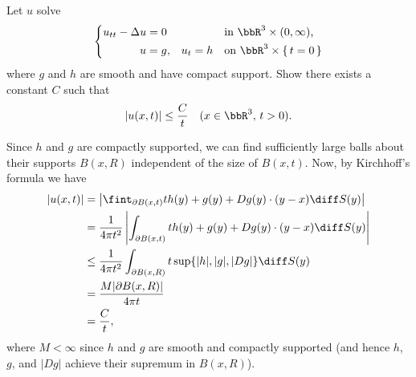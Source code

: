 \begin{problem}
  Let \(u\) solve
  \[
    \left\{
      \begin{aligned}
        u_{tt}-\Delta u=0\phantom{,}&&&&&\text{in \(\bbR^3\times(0,\infty)\),}\\
        u=g,&&u_t=h&&&\text{on \(\bbR^3\times\{\,t=0\,\}\)}
      \end{aligned}
    \right.
  \]
  where \(g\) and \(h\) are smooth and have compact support. Show there
  exists a constant \(C\) such that
  \[
    |u(x,t)|\leq \frac{C}{t}\quad(x\in\bbR^3,\,t>0).
  \]
\end{problem}
\begin{solution}
  Since \(h\) and \(g\) are compactly supported, we can find sufficiently
  large balls about their supports \(B(x,R)\) independent of the size of
  \(B(x,t)\). Now, by Kirchhoff's formula we have
  \begin{align*}
    |u(x,t)|
    &=\left|
      \fint_{\partial B(x,t)} th(y)+g(y)+Dg(y)\cdot(y-x)\diff S(y)
      \right|\\
    &=\frac{1}{4\pi t^2}\left|
      \int_{\partial B(x,t)} th(y)+g(y)+Dg(y)\cdot(y-x)\diff S(y)
      \right|\\
    &\leq\frac{1}{4\pi t^2}\int_{\partial B(x,R)}t\sup\{|h|,|g|,
      |Dg|\}\diff S(y)\\
    &=\frac{M|\partial B(x,R)|}{4\pi t}\\
    &=\frac{C}{t},
  \end{align*}
  where \(M<\infty\) since \(h\) and \(g\) are smooth and compactly
  supported (and hence \(h\), \(g\), and \(|Dg|\) achieve their supremum in
  \(B(x,R)\)).
\end{solution}


